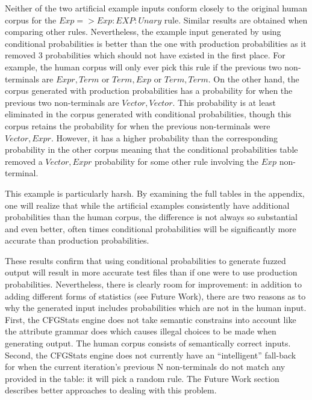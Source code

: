 Neither of the two artificial example inputs conform closely to the
original human corpus for the $Exp => Exp:EXP:Unary$ rule. Similar results are
obtained when comparing other rules. Nevertheless, the example input generated
by using conditional probabilities is better than the one with production
probabilities as it removed 3 probabilities which should not have existed in
the first place. For example, the human corpus will only ever pick this rule if
the previous two non-terminals are $Expr, Term$ or $Term, Exp$ or $Term, Term$.
On the other hand, the corpus generated with production probabilities has a
probability for when the previous two non-terminals are $Vector, Vector$. This
probability is at least eliminated in the corpus generated with conditional
probabilities, though this corpus retains the probability for when the previous
non-terminals were $Vector, Expr$. However, it has a higher probability
than the corresponding probability in the other corpus meaning that the
conditional probabilities table removed a $Vector, Expr$ probability for some
other rule involving the $Exp$ non-terminal.

This example is particularly harsh. By examining the full tables in the
appendix, one will realize that while the artificial examples consistently
have additional probabilities than the human corpus, the difference is not
always so substantial and even better, often times conditional probabilities
will be significantly more accurate than production probabilities.

These results confirm that using conditional probabilities to generate fuzzed
output will result in more accurate test files than if one were to use
production probabilities. Nevertheless, there is clearly room for improvement:
in addition to adding different forms of statistics (see Future Work), there
are two reasons as to why the generated input includes probabilities which are
not in the human input. First, the CFGStats engine does not take semantic
constrains into account like the attribute grammar does which causes illegal
choices to be made when generating output. The human corpus consists of
semantically correct inputs. Second, the CFGStats engine does not currently
have an ``intelligent'' fall-back for when the current iteration's previous N
non-terminals do not match any provided in the table: it will pick a random
rule. The Future Work section describes better approaches to dealing with this
problem.

